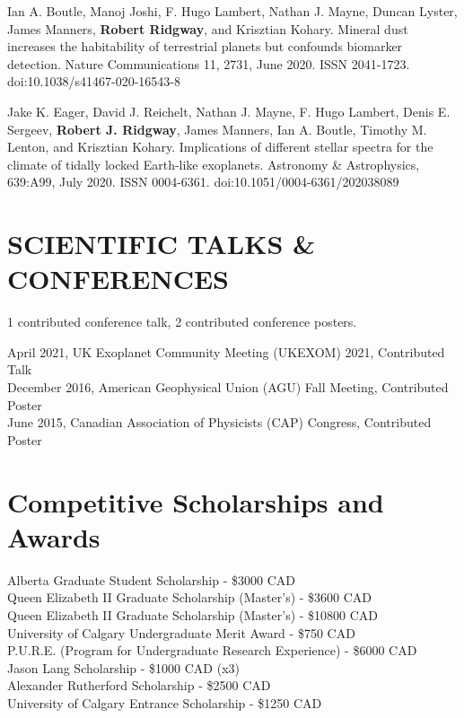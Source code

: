 \documentclass[letter, margin, 10pt]{res} %
\begin{document}
\begin{resume}
Ian A. Boutle, Manoj Joshi, F. Hugo Lambert, Nathan J. Mayne, Duncan Lyster, James Manners, \textbf{Robert Ridgway}, and Krisztian Kohary. Mineral dust increases the habitability of terrestrial planets but confounds biomarker detection. Nature Communications 11, 2731, June 2020. ISSN 2041-1723. doi:10.1038/s41467-020-16543-8

Jake K. Eager, David J. Reichelt, Nathan J. Mayne, F. Hugo Lambert, Denis E. Sergeev, \textbf{Robert J. Ridgway}, James Manners, Ian A. Boutle, Timothy M. Lenton, and Krisztian Kohary. Implications of different stellar spectra for the climate of tidally locked Earth-like exoplanets. Astronomy \& Astrophysics, 639:A99, July 2020. ISSN 0004-6361. doi:10.1051/0004-6361/202038089



\parskip \baselineskip
\vspace{-6pt}
\section{SCIENTIFIC TALKS \& CONFERENCES}
1 contributed conference talk, 2 contributed conference posters.

\vspace{-4pt}

April 2021, UK Exoplanet Community Meeting (UKEXOM) 2021, Contributed Talk\\
December 2016, American Geophysical Union (AGU) Fall Meeting, Contributed Poster\\
June 2015, Canadian Association of Physicists (CAP) Congress, Contributed Poster

\section{Competitive Scholarships and Awards}
\vspace{4pt}
Alberta Graduate Student Scholarship - \$3000 CAD\hfill{}\\
Queen Elizabeth II Graduate Scholarship (Master's) - \$3600 CAD\hfill{}\\
Queen Elizabeth II Graduate Scholarship (Master's) - \$10800 CAD\hfill{}\\
University of Calgary Undergraduate Merit Award - \$750 CAD\hfill{}\\
P.U.R.E. (Program for Undergraduate Research Experience) - \$6000 CAD\hfill{}\\
Jason Lang Scholarship - \$1000 CAD (x3)\hfill{}\\
Alexander Rutherford Scholarship - \$2500 CAD\hfill{}\\
University of Calgary Entrance Scholarship - \$1250 CAD\hfill{}

\end{resume}
\end{document}

